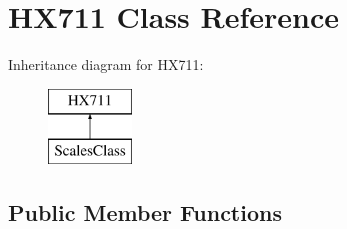 \hypertarget{class_h_x711}{\section{H\-X711 Class Reference}
\label{class_h_x711}
}
Inheritance diagram for H\-X711\-:\begin{figure}[H]
\begin{center}
\leavevmode
\includegraphics[height=2.000000cm]{class_h_x711}
\end{center}
\end{figure}
\subsection*{Public Member Functions}
